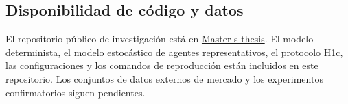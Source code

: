\subsection*{Disponibilidad de código y datos}

El repositorio público de investigación está en
\href{https://github.com/edwardcalderon/Master-s-thesis}{Master-s-thesis}. El modelo
determinista, el modelo estocástico de agentes representativos, el protocolo H1c, las
configuraciones y los comandos de reproducción están incluidos en este repositorio.
Los conjuntos de datos externos de mercado y los experimentos confirmatorios siguen
pendientes.
